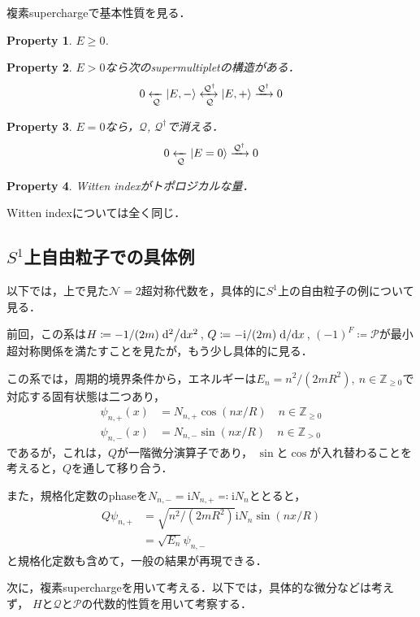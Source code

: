 \documentclass[english, dvipdfmx, a4paper]{jsarticle}
\theoremstyle{break}
\newtheorem{prop}{Property}
\newcommand{\Z}{\mathbb{Z}}
\renewcommand{\i}{\mathrm{i}}
\newcommand{\N}{\mathcal{N}}
\newcommand{\Q}{\mathcal{Q}}
\begin{document}
	複素superchargeで基本性質を見る．
	\setcounter{prop}{0}
	\begin{prop}
		$E\geq0$.
	\end{prop}
	\begin{prop}
		$E>0$なら次のsupermultipletの構造がある．
		\begin{equation}
			0\xleftarrow[\Q]{}\ket{E, -}\xleftrightarrow[\Q]{\Q^{\dag}}\ket{E, +} \xrightarrow[]{\Q^{\dag}} 0\label{eq:positive_spectrum}
		\end{equation}
	\end{prop}
	\begin{prop}
		$E=0$なら，$\Q$, $\Q^{\dag}$で消える．
		\begin{equation}
			0 \xleftarrow[\Q]{}\ket{E=0}\xrightarrow[]{\Q^{\dag}}0\label{eq:zero_spectrum}
		\end{equation}
	\end{prop}
	\begin{prop}
		Witten indexがトポロジカルな量．
	\end{prop}
	Witten indexについては全く同じ．
	\subsection{\texorpdfstring{$S^1$}{S1}上自由粒子での具体例}
	以下では，上で見た$\N=2$超対称代数を，具体的に$S^1$上の自由粒子の例について見る．


	前回，この系は$H\coloneqq -1/(2m)\dv*[2]{}{x}$, $Q\coloneqq -\i/(2m)\dv*{}{x}$, $(-1)^{F}\coloneqq \mathcal{P}$が最小超対称関係を満たすことを見たが，もう少し具体的に見る．

	この系では，周期的境界条件から，エネルギーは$E_n = n^2/(2mR^2),\ n\in\Z_{\geq0}$で対応する固有状態は二つあり，
	\begin{align}
		\psi_{n, +}(x) &= N_{n, +}\cos(nx/R)\quad n\in\Z_{\geq 0}\\
		\psi_{n, -}(x) &= N_{n, -}\sin(nx/R)\quad n \in \Z_{>0}
	\end{align}
	であるが，これは，$Q$が一階微分演算子であり，
	$\sin$と$\cos$が入れ替わることを考えると，$Q$を通して移り合う．

	また，規格化定数のphaseを$N_{n, -} = \i N_{n, +} \eqqcolon \i N_n$ととると，
	\begin{align}
		Q\psi_{n, +} &= \sqrt{n^2/(2mR^2)}\i N_n\sin(nx/R)\\
					 &= \sqrt{E_n}\psi_{n, -}
	\end{align}
	と規格化定数も含めて，一般の結果が再現できる．

	次に，複素superchargeを用いて考える．以下では，具体的な微分などは考えず，
	$H$と$\Q$と$\mathcal{P}$の代数的性質を用いて考察する．
\end{document}
